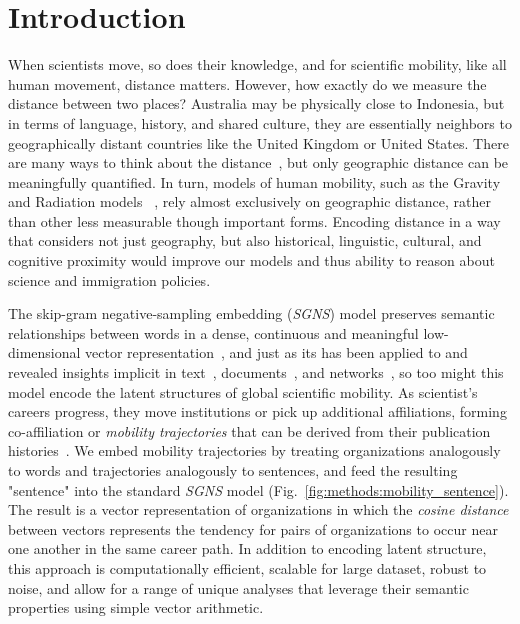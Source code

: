 \documentclass[12pt]{article} %
\def\SGNS{\textit{SGNS}}
\begin{document}
%
%
\section{Introduction}\label{sec:introduction} %


When scientists move, so does their knowledge, and for scientific mobility, like all human movement, distance matters. 
However, how exactly do we measure the distance between two places?
Australia may be physically close to Indonesia, but in terms of language, history, and shared culture, they are essentially neighbors to geographically distant countries like the United Kingdom or United States. 
There are many ways to think about the distance~\autocite{boschma2005proximity}, but only geographic distance can be meaningfully quantified. 
In turn, models of human mobility, such as the Gravity~\autocite{zipf1946gravity} and Radiation models ~\autocite{simini2012universal}, rely almost exclusively on geographic distance, rather than other less measurable though important forms. 
Encoding distance in a way that considers not just geography, but also historical, linguistic, cultural, and cognitive proximity would improve our models and thus ability to reason about science and immigration policies. 

The skip-gram negative-sampling embedding (\SGNS) model preserves semantic relationships between words in a dense, continuous and meaningful low-dimensional vector representation~\autocite{mikolov2013word2vec}, and just as its has been applied to and revealed insights implicit in text~\autocite{linzhuo2020hyperbolic, tshitoyan2019mat2vec, garg2018gender, kozlowski2018geometry, hamilton2016diachronic}, documents~\autocite{le2014doc2vec, nakandala2016twitch}, and networks~\autocite{perozzi2014deepwalk, grover2016node2vec}, so too might this model encode the latent structures of global scientific mobility. 
As scientist's careers progress, they move institutions or pick up additional affiliations, forming co-affiliation or \textit{mobility trajectories} that can be derived from their publication histories~\autocite{robinson2019mobility, sugimoto2017mostimpact}. 
We embed mobility trajectories by treating organizations analogously to words and trajectories analogously to sentences, and feed the resulting "sentence" into the standard \SGNS{} model (Fig.~\ref{fig:methods:mobility_sentence}).
The result is a vector representation of organizations in which the \textit{cosine distance} between vectors represents the tendency for pairs of organizations to occur near one another in the same career path. 
In addition to encoding latent structure, this approach is computationally efficient, scalable for large dataset, robust to noise, and allow for a range of unique analyses that leverage their semantic properties using simple vector arithmetic. 
\end{document}
